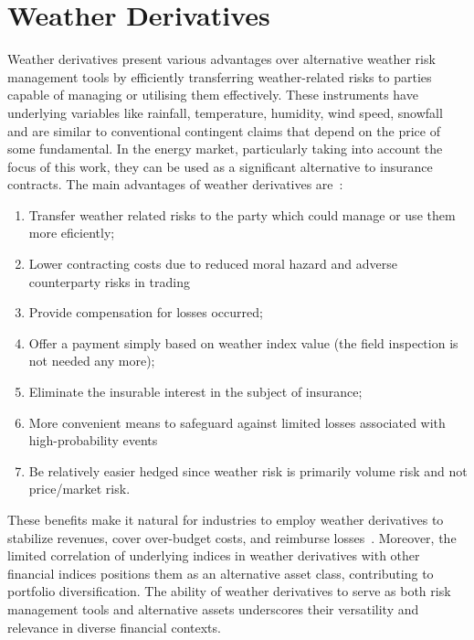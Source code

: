 \section{Weather Derivatives}
\label{sec:weather_derivatives}

    Weather derivatives present various advantages over alternative weather risk management tools
    by efficiently transferring weather-related risks to parties capable of managing or utilising them effectively.
    These instruments have underlying variables like rainfall, temperature, humidity, wind speed,
    snowfall and are similar to conventional contingent claims that depend on the price of some fundamental.
    In the energy market, particularly taking into account the focus of this work,
    they can be used as a significant alternative to insurance contracts.
    The main advantages of weather derivatives are~\cite{cui_applications_2015}:

    \begin{enumerate}
        \item Transfer weather related risks to the party which could manage or use them more eficiently;
        \item Lower contracting costs due to reduced moral hazard and adverse counterparty risks in trading
        \item Provide compensation for losses occurred;
        \item Offer a payment simply based on weather index value (the field inspection is not needed any more);
        \item Eliminate the insurable interest in the subject of insurance;
        \item More convenient means to safeguard against limited losses associated with high-probability events
        \item Be relatively easier hedged since weather risk is primarily volume risk and not price/market risk.
    \end{enumerate}

    These benefits make it natural for industries to employ weather derivatives to stabilize revenues,
    cover over-budget costs, and reimburse losses~\cite{matsumoto_simultaneous_2021}.
    Moreover, the limited correlation of underlying indices in weather derivatives with other financial indices
    positions them as an alternative asset class, contributing to portfolio diversification.
    The ability of weather derivatives to serve as both risk management tools and alternative assets underscores their
    versatility and relevance in diverse financial contexts.\\

